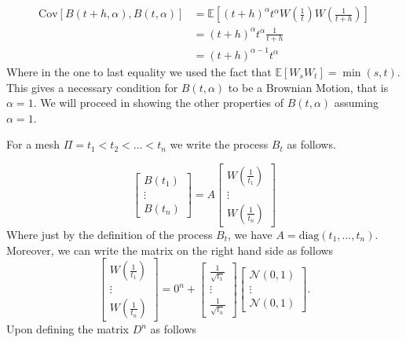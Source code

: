 \documentclass[a4paper,12pt]{article} %
\newcommand{\Cov}{\mathrm{Cov}}
\begin{document}
\begin{align*}
    \Cov\left[B(t+h, \alpha ), B(t, \alpha ) \right] & = \mathbb{E} \left[ (t+h)^{\alpha} t^{\alpha} W\left( \frac{1}{t} \right) W\left( \frac{1}{t+h} \right) \right] \\
                                                     & = (t+h)^{\alpha } t^{\alpha } \frac{1}{t+h}                                                                     \\
                                                     & = (t+h)^{\alpha -1} t^{\alpha }
\end{align*}
Where in the one to last equality we used the fact that \(\mathbb{E} \left[ W_s W_t \right]= \min (s,t)\).
This gives a necessary condition for \(B(t, \alpha )\) to be a Brownian Motion, that is \(\alpha =1\).
We will proceed in showing the other properties of \(B(t, \alpha )\) assuming \(\alpha =1\).

For a mesh \(\Pi  = t_1 <t_2<\dots <t_n\) we write the process \(B_t\) as follows.

\begin{equation}
    \begin{bmatrix}
        B(t_1) \\
        \vdots \\
        B(t_n)
    \end{bmatrix}
    = A
    \begin{bmatrix}
        W\left( \frac{1}{t_1} \right) \\
        \vdots                        \\
        W\left( \frac{1}{t_n} \right)
    \end{bmatrix}
\end{equation}
Where just by the definition of the process \(B_t\), we have \(A = \mathrm{diag} (t_1, \dots ,t_n)\).
Moreover, we can write the matrix on the right hand side as follows
\begin{equation}
    \begin{bmatrix}
        W\left( \frac{1}{t_1} \right) \\
        \vdots                        \\
        W\left( \frac{1}{t_n} \right)
    \end{bmatrix}
    = 0^n +
    \begin{bmatrix}
        \frac{1}{\sqrt{t_1}} \\
        \vdots               \\
        \frac{1}{\sqrt{t_n}}
    \end{bmatrix}
    \begin{bmatrix}
        \mathcal{N}(0, 1) \\
        \vdots            \\
        \mathcal{N}(0, 1)
    \end{bmatrix}.
\end{equation}
Upon defining the matrix \(D^n \) as follows
\end{document}
